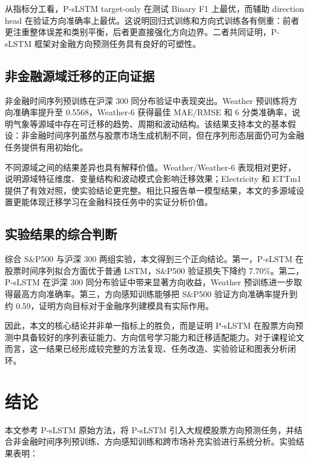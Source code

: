 \documentclass[UTF8,a4paper,twocolumn]{ctexart}
\begin{document}
从指标分工看，P-sLSTM target-only 在测试 Binary F1 上最优，而辅助 direction head 在验证方向准确率上最优。这说明回归式训练和方向式训练各有侧重：前者更注重整体误差和类别平衡，后者更直接强化方向边界。二者共同证明，P-sLSTM 框架对金融方向预测任务具有良好的可塑性。

\subsection{非金融源域迁移的正向证据}

非金融时间序列预训练在沪深 300 同分布验证中表现突出。Weather 预训练将方向准确率提升至 0.5568，Weather-6 获得最佳 MAE/RMSE 和 6 分类准确率，说明气象等源域中存在可迁移的趋势、周期和波动结构。该结果支持本文的基本假设：非金融时间序列虽然与股票市场生成机制不同，但在序列形态层面仍可为金融任务提供有用初始化。

不同源域之间的结果差异也具有解释价值。Weather/Weather-6 表现相对更好，说明源域特征维度、变量结构和波动模式会影响迁移效果；Electricity 和 ETTm1 提供了有效对照，使实验结论更完整。相比只报告单一模型结果，本文的多源域设置更能体现迁移学习在金融科技任务中的实证分析价值。

\subsection{实验结果的综合判断}

综合 S\&P500 与沪深 300 两组实验，本文得到三个正向结论。第一，P-sLSTM 在股票时间序列拟合方面优于普通 LSTM，S\&P500 验证损失下降约 7.70\%。第二，P-sLSTM 在沪深 300 同分布验证中带来显著方向收益，Weather 预训练进一步取得最高方向准确率。第三，方向感知训练能够把 S\&P500 验证方向准确率提升到约 0.59，证明方向目标对于金融序列建模具有实际作用。

因此，本文的核心结论并非单一指标上的胜负，而是证明 P-sLSTM 在股票方向预测中具备较好的序列表征能力、方向信号学习能力和迁移适配能力。对于课程论文而言，这一结果已经形成较完整的方法复现、任务改造、实验验证和图表分析闭环。

\section{结论}

本文参考 P-sLSTM 原始方法，将 P-sLSTM 引入大规模股票方向预测任务，并结合非金融时间序列预训练、方向感知训练和跨市场补充实验进行系统分析。实验结果表明：
\end{document}
